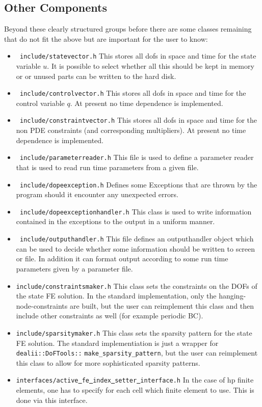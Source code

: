 \subsection{Other Components}
Beyond these clearly structured groups before there are some classes remaining that
do not fit the above but are important for the user to know:
\begin{itemize}
\item \texttt{ include/statevector.h} This stores all dofs in space and time for the state 
  variable $u$. It is possible to select whether all this should be kept in memory or 
  or unused parts can be written to the hard disk.
\item \texttt{ include/controlvector.h} This stores all dofs in space and time for the 
  control variable $q$. At present no time dependence is implemented.
\item \texttt{ include/constraintvector.h} This stores all dofs in space and time for the 
  non PDE constraints (and corresponding multipliers). 
  At present no time dependence is implemented.
\item \texttt{ include/parameterreader.h} This file is used to define a parameter reader
  that is used to read run time parameters from a given file.
\item \texttt{ include/dopeexception.h} Defines some Exceptions that are thrown by the program
  should it encounter any unexpected errors.
\item \texttt{ include/dopeexceptionhandler.h} This class is used to write information 
  contained in the exceptions to the output in a uniform manner.
\item \texttt{ include/outputhandler.h} This file defines an outputhandler object which 
  can be used to decide whether some information should be written to screen or file.
  In addition it can format output according to some run time parameters given by a 
  parameter file.
\item \texttt{include/constraintsmaker.h} This class sets the constraints on the DOFs of the state FE solution. In the standard implementation, only the hanging-node-constraints are built, but the user can reimplement this class and then include other constraints as well (for example periodic BC).
\item \texttt{include/sparsitymaker.h} This class sets the sparsity pattern for the state FE solution. The standard implementiation is just a wrapper for \texttt{dealii::DoFTools::} \texttt{make\_sparsity\_pattern}, but the user can reimplement this class to allow for more sophisticated sparsity patterns.
\item \texttt{interfaces/active\underline{ }fe\underline{ }index\underline{ }setter\underline{ }interface.h} In the case of hp finite elements, one has to specify for each cell which finite element to use. This is done via this interface.
\end{itemize}

